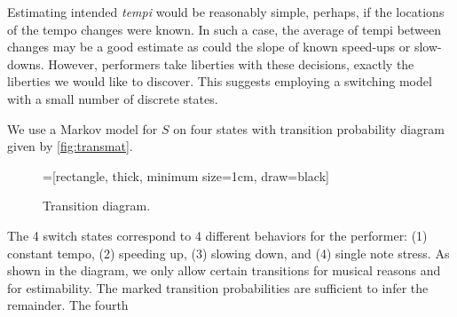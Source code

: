 \documentclass[12pt]{article}
\begin{document}
Estimating intended {\em tempi} would be reasonably simple, perhaps, 
if the locations of the tempo changes were known. In such a case,
the average of tempi between changes may be a good estimate as
could the slope of known speed-ups or slow-downs. However, performers
take liberties with these decisions, exactly the liberties we would
like to discover. This suggests employing a switching model with a
small number of discrete states.

We use a Markov model for $S$ on four states
with transition probability
diagram given by \autoref{fig:transmat}.
\begin{figure}[tb!]
  \centering
  =[rectangle,
  thick, minimum size=1cm, draw=black]
  \caption{Transition diagram. \label{fig:transmat}}
\end{figure}
The 4 switch states correspond to 4 different behaviors for the
performer: (1) constant tempo, (2) speeding up, (3) slowing down, and
(4) single note stress. As shown in the diagram, we only allow certain
transitions for musical reasons and for estimability. The marked
transition probabilities are sufficient to infer the remainder. The fourth
\end{document}
